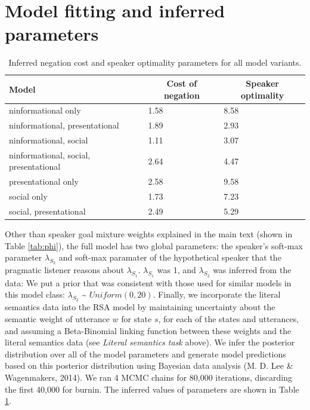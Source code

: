 \documentclass[oneside]{report}
\begin{document}
\section{Model fitting and inferred
parameters}\label{model-fitting-and-inferred-parameters}
\begin{table}[tbp]
\begin{center}
\begin{threeparttable}
\caption{\label{tab:otherParams}Inferred negation cost and speaker optimality parameters for all model variants.}
\begin{tabular}{lll}
\toprule
Model & \multicolumn{1}{c}{Cost of negation} & \multicolumn{1}{c}{Speaker optimality}\\
\midrule
ninformational only & 1.58 & 8.58\\
ninformational, presentational & 1.89 & 2.93\\
ninformational, social & 1.11 & 3.07\\
ninformational, social, presentational & 2.64 & 4.47\\
presentational only & 2.58 & 9.58\\
social only & 1.73 & 7.23\\
social, presentational & 2.49 & 5.29\\
\bottomrule
\end{tabular}
\end{threeparttable}
\end{center}
\end{table}
Other than speaker goal mixture weights explained in the main text
(shown in Table \ref{tab:phi}), the full model has two global
parameters: the speaker's soft-max parameter \(\lambda_{S_2}\) and
soft-max paramater of the hypothetical speaker that the pragmatic
listener reasons about \(\lambda_{S_1}\). \(\lambda_{S_1}\) was 1, and
\(\lambda_{S_2}\) was inferred from the data: We put a prior that was
consistent with those used for similar models in this model class:
\(\lambda_{S_2}\) \textasciitilde{} \(Uniform(0,20)\). Finally, we
incorporate the literal semantics data into the RSA model by maintaining
uncertainty about the semantic weight of utterance \(w\) for state
\(s\), for each of the states and utterances, and assuming a
Beta-Binomial linking function between these weights and the literal
semantics data (see \emph{Literal semantics task} above). We infer the
posterior distribution over all of the model parameters and generate
model predictions based on this posterior distribution using Bayesian
data analysis (M. D. Lee \& Wagenmakers, 2014). We ran 4 MCMC chains for
80,000 iterations, discarding the first 40,000 for burnin. The inferred
values of parameters are shown in Table \ref{tab:otherParams}.
\end{document}
